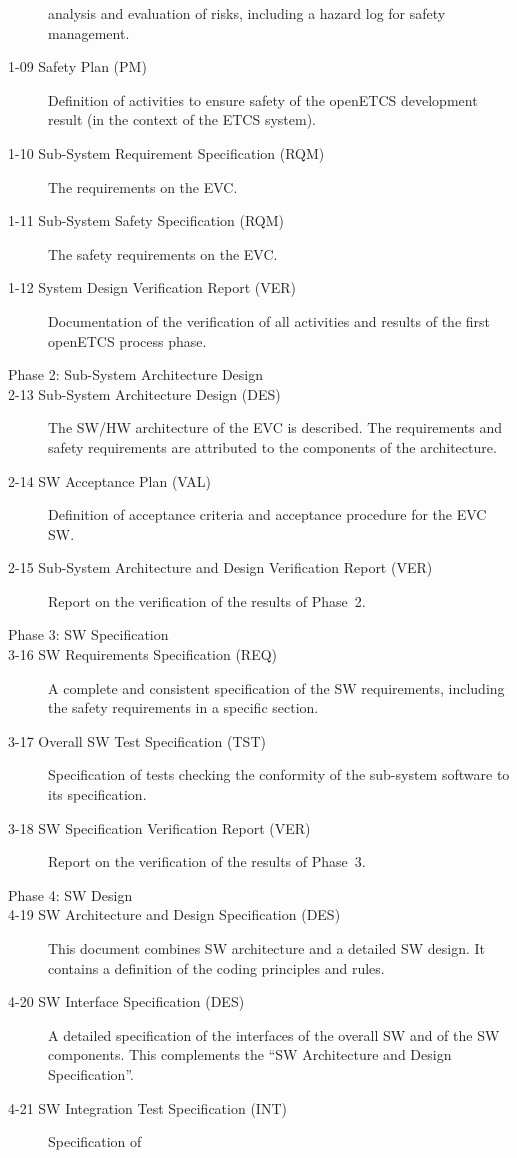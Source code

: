 \documentclass{template/openetcs_article}
\begin{document}
\begin{description}
  analysis and evaluation of risks, including a hazard log for safety management.
\item[1-09 Safety Plan (PM)] Definition of activities to ensure safety of
  the openETCS development result (in the context of the ETCS system). 
\item[1-10 Sub-System Requirement Specification (RQM)] The
  requirements on the EVC.
\item[1-11 Sub-System Safety Specification (RQM)] The safety
  requirements on the EVC.
\item[1-12 System Design Verification Report (VER)] Documentation of the verification
  of all activities and results of the first openETCS process phase.
\item[Phase 2: Sub-System Architecture Design] 
\item[2-13 Sub-System Architecture Design (DES)] The SW/HW
  architecture of the EVC is described. The requirements and safety requirements are
  attributed to the components of the architecture.
\item[2-14 SW Acceptance Plan (VAL)] Definition of acceptance criteria and
  acceptance procedure for the EVC SW.  
\item[2-15 Sub-System Architecture and Design Verification Report (VER)]
  Report on the verification of the results of Phase~2.
\item[Phase 3: SW Specification] 
\item[3-16 SW Requirements Specification (REQ)]  A complete and consistent
  specification of the SW requirements, including the safety
  requirements in a specific section. 
\item[3-17 Overall SW Test Specification (TST)] Specification of tests
  checking the conformity of the sub-system software to its specification. 
\item[3-18 SW Specification Verification Report (VER)] Report on the
  verification of the results of Phase~3.
\item[Phase 4: SW Design] 
\item[4-19 SW Architecture and Design Specification (DES)]  This
  document combines SW architecture and a detailed SW design. It contains a
  definition of the coding principles and rules.
\item[4-20 SW Interface Specification (DES)] A detailed specification
  of the interfaces of the overall SW and of the SW components. This
  complements the ``SW Architecture and Design Specification''.
\item[4-21 SW Integration Test Specification (INT)] Specification of

\end{description}
\end{document}
